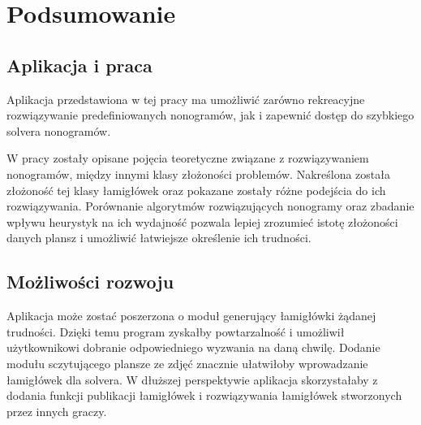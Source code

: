 \chapter{Podsumowanie}
\thispagestyle{chapterBeginStyle}



\section{Aplikacja i praca}
    Aplikacja przedstawiona w tej pracy ma umożliwić zarówno rekreacyjne rozwiązywanie predefiniowanych
nonogramów, jak i zapewnić dostęp do szybkiego solvera nonogramów. 

    W pracy zostały opisane pojęcia teoretyczne związane z rozwiązywaniem nonogramów, 
między innymi klasy złożoności problemów. Nakreślona została złożoność tej klasy łamigłówek 
oraz pokazane zostały różne podejścia do ich rozwiązywania. Porównanie algorytmów rozwiązujących
nonogramy oraz zbadanie wpływu heurystyk na ich wydajność pozwala lepiej zrozumieć istotę
złożoności danych plansz i umożliwić łatwiejsze określenie ich trudności.


\section{Możliwości rozwoju}
    Aplikacja może zostać poszerzona o moduł generujący łamigłówki żądanej trudności. Dzięki temu
program zyskałby powtarzalność i umożliwił użytkownikowi dobranie odpowiedniego wyzwania na
daną chwilę. Dodanie modułu sczytującego plansze ze zdjęć znacznie ułatwiłoby wprowadzanie łamigłówek
dla solvera. W dłuższej perspektywie aplikacja skorzystałaby z dodania funkcji publikacji
łamigłówek i rozwiązywania łamigłówek stworzonych przez innych graczy.
